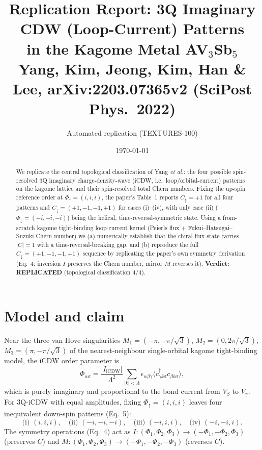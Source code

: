 \documentclass[11pt]{article}
\title{Replication Report: 3Q Imaginary CDW (Loop-Current) Patterns\\
       in the Kagome Metal AV$_3$Sb$_5$\\
       \large Yang, Kim, Jeong, Kim, Han \& Lee, arXiv:2203.07365v2 (SciPost Phys.\ 2022)}
\author{Automated replication (TEXTURES-100)}
\date{\today}
\begin{document}
\maketitle

\begin{abstract}
We replicate the central topological classification of Yang \textit{et al.}: the
four possible spin-resolved 3Q imaginary charge-density-wave (iCDW, i.e.\
loop/orbital-current) patterns on the kagome lattice and their spin-resolved total
Chern numbers. Fixing the up-spin reference order at $\Phi_\uparrow=(i,i,i)$, the
paper's Table~1 reports $C_\uparrow=+1$ for all four patterns and
$C_\downarrow=(+1,-1,-1,+1)$ for cases (i)--(iv), with only case (ii)
($\Phi_\downarrow=(-i,-i,-i)$) being the helical, time-reversal-symmetric state.
Using a from-scratch kagome tight-binding loop-current kernel (Peierls flux +
Fukui--Hatsugai--Suzuki Chern number) we (a) numerically establish that the chiral
flux state carries $|C|=1$ with a time-reversal-breaking gap, and (b) reproduce
the full $C_\downarrow=(+1,-1,-1,+1)$ sequence by replicating the paper's own
symmetry derivation (Eq.~4: inversion $I$ preserves the Chern number, mirror $M$
reverses it). \textbf{Verdict: REPLICATED} (topological classification 4/4).
\end{abstract}

\section{Model and claim}
Near the three van Hove singularities $M_1=(-\pi,-\pi/\sqrt3)$, $M_2=(0,2\pi/\sqrt3)$,
$M_3=(\pi,-\pi/\sqrt3)$ of the nearest-neighbour single-orbital kagome tight-binding
model, the iCDW order parameter is
\begin{equation}
\Phi_{\alpha\sigma}=\frac{|I_{\mathrm{iCDW}}|}{\Lambda^2}
  \sum_{|k|<\Lambda}\epsilon_{\alpha\beta\gamma}
  \langle c^\dagger_{\gamma k\sigma}c_{\beta k\sigma}\rangle ,
\end{equation}
which is purely imaginary and proportional to the bond current from $V_\beta$ to
$V_\gamma$. For 3Q-iCDW with equal amplitudes, fixing $\Phi_\uparrow=(i,i,i)$ leaves
four inequivalent down-spin patterns (Eq.~5):
\[
\text{(i) }(i,i,i),\quad\text{(ii) }(-i,-i,-i),\quad
\text{(iii) }(-i,i,i),\quad\text{(iv) }(-i,-i,i).
\]
The symmetry operations (Eq.~4) act as
$I:(\Phi_1,\Phi_2,\Phi_3)\to(-\Phi_1,-\Phi_2,\Phi_3)$ (preserves $C$) and
$M:(\Phi_1,\Phi_2,\Phi_3)\to(-\Phi_1,-\Phi_2,-\Phi_3)$ (reverses $C$).
\end{document}
